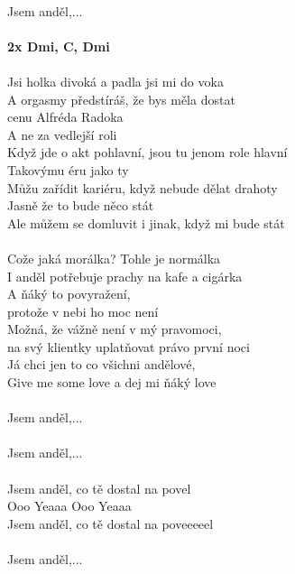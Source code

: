 \begin{multicols}{2}
\\
Jsem anděl,...\\
\\
\footnotesize\textbf{2x Dmi, C, Dmi}\\
\columnbreak
\\
\normalsize
Jsi holka divoká a padla jsi mi do voka\\
A orgasmy předstíráš, že bys měla dostat \\
cenu Alfréda Radoka\\
A ne za vedlejší roli\\
Když jde o akt pohlavní, jsou tu jenom role hlavní\\
Takovýmu éru jako ty\\
Můžu zařídit kariéru, když nebude dělat drahoty\\
Jasně že to bude něco stát\\
Ale můžem se domluvit i jinak, když mi bude stát\\
\\
Cože jaká morálka? Tohle je normálka\\
I anděl potřebuje prachy na kafe a cigárka\\
A ňáký to povyražení,\\
protože v nebi ho moc není\\
Možná, že vážně není v mý pravomoci,\\
na svý klientky uplatňovat právo první noci\\
Já chci jen to co všichni andělové,\\
Give me some love a dej mi ňáký love\\
\\
Jsem anděl,...\\
\\
Jsem anděl,...\\
\\
Jsem anděl, co tě dostal na povel\\
Ooo Yeaaa Ooo Yeaaa\\
Jsem anděl, co tě dostal na poveeeeel\\
\\
Jsem anděl,...\\
\end{multicols}
